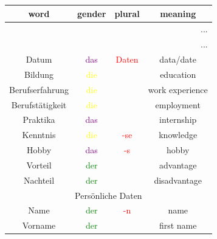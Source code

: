 \begin{center}
    \begin{longtable} {|c|c|c|c|}
        \hline
        \rowcolor{gray}
        word                   & gender                  & plural                 & meaning                       \\
        \hline
        \endfirsthead
        \multicolumn{4}{r}{...}                                                                                   \\
        \hline
        \endhead
        \hline
        \multicolumn{4}{r}{...}                                                                                   \\
        \endfoot
        \hline
        \endlastfoot
        \hline
        Datum                  & \textcolor{purple}{das} & \textcolor{red}{Daten} & data/date                     \\
        Bildung                & \textcolor{yellow}{die} &                        & education                     \\
        Berufserfahrung        & \textcolor{yellow}{die} &                        & work experience               \\
        Berufstätigkeit        & \textcolor{yellow}{die} &                        & employment                    \\
        Praktika               & \textcolor{purple}{das} &                        & internship                    \\
        Kenntnis               & \textcolor{yellow}{die} & \textcolor{red}{-se}   & knowledge                     \\
        Hobby                  & \textcolor{purple}{das} & \textcolor{red}{-s}    & hobby                         \\
        Vorteil                & \textcolor{green}{der}  &                        & advantage                     \\
        Nachteil               & \textcolor{green}{der}  &                        & disadvantage                  \\
        \hline
        \multicolumn{4}{|c|}{Persönliche Daten}                                                                   \\
        \hline
        Name                   & \textcolor{green}{der}  & \textcolor{red}{-n}    & name                          \\
        Vorname                & \textcolor{green}{der}  &                        & first name                    \\

\end{longtable}
\end{center}
